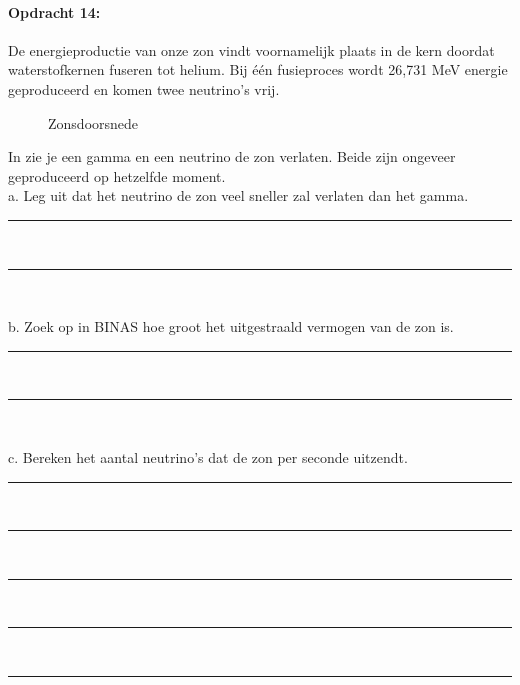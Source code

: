 \paragraph{Opdracht 14:}
De energieproductie van onze zon vindt voornamelijk plaats in de kern doordat 
waterstofkernen fuseren tot helium.
Bij één fusieproces wordt 26,731 \si{MeV} energie geproduceerd en komen 
twee neutrino's vrij.\\
\begin{figure}
\centering
{}
\caption{Zonsdoorsnede} 
\label{fig:Zonsdoorsnede}
\end{figure}
In  zie je een gamma en een neutrino de zon 
verlaten. Beide zijn ongeveer geproduceerd op hetzelfde moment. \\
a. Leg uit dat het neutrino de zon veel sneller zal verlaten dan het gamma.
\begin{center}
    \rule{\textwidth}{0.3mm}\\
    \rule{\textwidth}{0.3mm}\\
\end{center} 
b. Zoek op in BINAS hoe groot het uitgestraald vermogen van de zon is.
\begin{center}
    \rule{\textwidth}{0.3mm}\\
    \rule{\textwidth}{0.3mm}\\
\end{center}
c. Bereken het aantal neutrino's dat de zon per seconde uitzendt.
\begin{center}
    \rule{\textwidth}{0.3mm}\\
    \rule{\textwidth}{0.3mm}\\
    \rule{\textwidth}{0.3mm}\\
    \rule{\textwidth}{0.3mm}\\
    \rule{\textwidth}{0.3mm}\\
\end{center}
